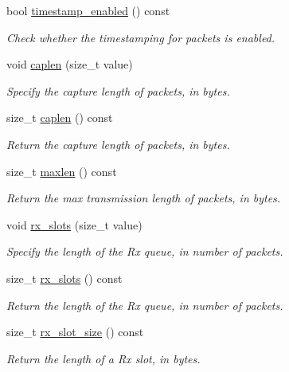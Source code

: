 \begin{DoxyCompactItemize}
bool \hyperlink{classpfq_1_1socket_a6a170b8ebc6b03760c4096cd176af8cf}{timestamp\+\_\+enabled} () const 
\begin{DoxyCompactList}\small\item\em Check whether the timestamping for packets is enabled. \end{DoxyCompactList}\item 
void \hyperlink{classpfq_1_1socket_ab68dbba5ef01041b9c96758c4a9f0a6c}{caplen} (size\+\_\+t value)
\begin{DoxyCompactList}\small\item\em Specify the capture length of packets, in bytes. \end{DoxyCompactList}\item 
size\+\_\+t \hyperlink{classpfq_1_1socket_a768bee4d974acdc5ee9ee879b0903c54}{caplen} () const 
\begin{DoxyCompactList}\small\item\em Return the capture length of packets, in bytes. \end{DoxyCompactList}\item 
size\+\_\+t \hyperlink{classpfq_1_1socket_a45bd7aa973fe4eccce899c552adfedb5}{maxlen} () const 
\begin{DoxyCompactList}\small\item\em Return the max transmission length of packets, in bytes. \end{DoxyCompactList}\item 
void \hyperlink{classpfq_1_1socket_a5cf700fc12d67b91df3d669ac4aa737a}{rx\+\_\+slots} (size\+\_\+t value)
\begin{DoxyCompactList}\small\item\em Specify the length of the Rx queue, in number of packets. \end{DoxyCompactList}\item 
size\+\_\+t \hyperlink{classpfq_1_1socket_a0f2205329249eaa7a6229980a744fd2a}{rx\+\_\+slots} () const 
\begin{DoxyCompactList}\small\item\em Return the length of the Rx queue, in number of packets. \end{DoxyCompactList}\item 
size\+\_\+t \hyperlink{classpfq_1_1socket_a8e290b6b1105c22b538d38021d6bfb7d}{rx\+\_\+slot\+\_\+size} () const 
\begin{DoxyCompactList}\small\item\em Return the length of a Rx slot, in bytes. \end{DoxyCompactList}\item 

\end{DoxyCompactItemize}
